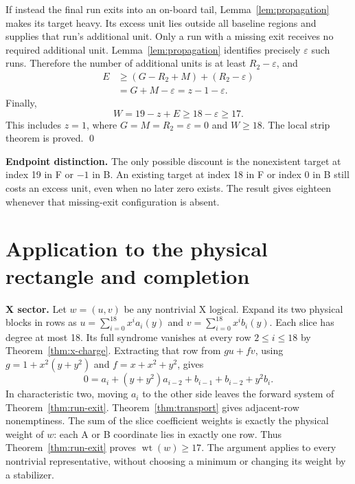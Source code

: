 \documentclass{article}
\DeclareMathOperator{\wt}{wt}
\begin{document}
If instead the final run exits into an on-board tail, Lemma~\ref{lem:propagation} makes its
target heavy. Its excess unit lies outside all baseline regions and supplies that run's
additional unit. Only a run with a missing exit receives no required additional unit.
Lemma~\ref{lem:propagation} identifies precisely \(\varepsilon\) such runs. Therefore the
number of additional units is at least \(R_2 - \varepsilon\), and
\begin{equation}
  \begin{aligned}
    E &\ge (G - R_2 + M) + (R_2 - \varepsilon) \\
      &= G + M - \varepsilon = z - 1 - \varepsilon.
  \end{aligned}
\end{equation}
Finally,
\begin{equation}
  W = 19 - z + E \ge 18 - \varepsilon \ge 17.
\end{equation}
This includes \(z = 1\), where \(G = M = R_2 = \varepsilon = 0\) and \(W \ge 18\). The local
strip theorem is proved. \qed

\textbf{Endpoint distinction.} The only possible discount is the nonexistent target at index
19 in F or \(-1\) in B. An existing target at index 18 in F or index 0 in B still costs an
excess unit, even when no later zero exists. The result gives eighteen whenever that
missing-exit configuration is absent.

\section{Application to the physical rectangle and completion}\label{sec:application}

\textbf{X sector.} Let \(w = (u,v)\) be any nontrivial X logical. Expand its two physical
blocks in rows as \(u = \sum_{i=0}^{18} x^i a_i(y)\) and \(v = \sum_{i=0}^{18} x^i b_i(y)\).
Each slice has degree at most 18. Its full syndrome vanishes at every row
\(2 \le i \le 18\) by Theorem~\ref{thm:x-charge}. Extracting that row from \(gu + fv\), using
\(g = 1 + x^2(y + y^2)\) and \(f = x + x^2 + y^2\), gives
\begin{equation}
  0 = a_i + (y + y^2) a_{i-2} + b_{i-1} + b_{i-2} + y^2 b_i.
\end{equation}
In characteristic two, moving \(a_i\) to the other side leaves the forward system of
Theorem~\ref{thm:run-exit}. Theorem~\ref{thm:transport} gives adjacent-row nonemptiness. The
sum of the slice coefficient weights is exactly the physical weight of \(w\): each A or B
coordinate lies in exactly one row. Thus Theorem~\ref{thm:run-exit} proves
\(\wt(w) \ge 17\). The argument applies to every nontrivial representative, without choosing
a minimum or changing its weight by a stabilizer.
\end{document}
